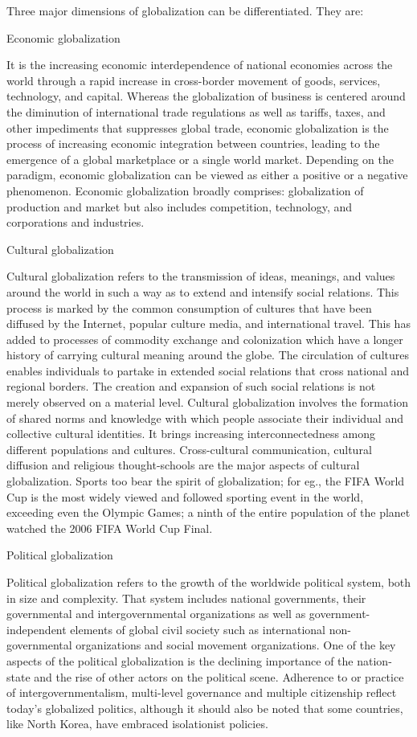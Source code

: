 \documentclass[
  openany]{book}
\begin{document}
Three major dimensions of globalization can be differentiated. They are:

Economic globalization

It is the increasing economic interdependence of national economies across the world through a rapid increase in cross-border movement of goods, services, technology, and capital. Whereas the globalization of business is centered around the diminution of international trade regulations as well as tariffs, taxes, and other impediments that suppresses global trade, economic globalization is the process of increasing economic integration between countries, leading to the emergence of a global marketplace or a single world market. Depending on the paradigm, economic globalization can be viewed as either a positive or a negative phenomenon. Economic globalization broadly comprises: globalization of production and market but also includes competition, technology, and corporations and industries.

Cultural globalization

Cultural globalization refers to the transmission of ideas, meanings, and values around the world in such a way as to extend and intensify social relations. This process is marked by the common consumption of cultures that have been diffused by the Internet, popular culture media, and international travel. This has added to processes of commodity exchange and colonization which have a longer history of carrying cultural meaning around the globe. The circulation of cultures enables individuals to partake in extended social relations that cross national and regional borders. The creation and expansion of such social relations is not merely observed on a material level. Cultural globalization involves the formation of shared norms and knowledge with which people associate their individual and collective cultural identities. It brings increasing interconnectedness among different populations and cultures. Cross-cultural communication, cultural diffusion and religious thought-schools are the major aspects of cultural globalization. Sports too bear the spirit of globalization; for eg., the FIFA World Cup is the most widely viewed and followed sporting event in the world, exceeding even the Olympic Games; a ninth of the entire population of the planet watched the 2006 FIFA World Cup Final.

Political globalization

Political globalization refers to the growth of the worldwide political system, both in size and complexity. That system includes national governments, their governmental and intergovernmental organizations as well as government-independent elements of global civil society such as international non-governmental organizations and social movement organizations. One of the key aspects of the political globalization is the declining importance of the nation-state and the rise of other actors on the political scene. Adherence to or practice of intergovernmentalism, multi-level governance and multiple citizenship reflect today's globalized politics, although it should also be noted that some countries, like North Korea, have embraced isolationist policies.
\end{document}
